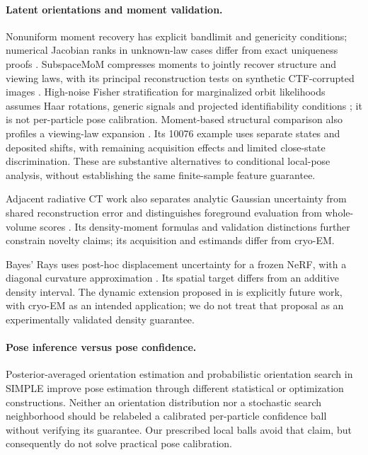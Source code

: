\paragraph{Latent orientations and moment validation.}
Nonuniform moment recovery has explicit bandlimit and genericity conditions;
numerical Jacobian ranks in unknown-law cases differ from exact uniqueness
proofs \citep{sharon2020}. SubspaceMoM compresses moments to jointly recover
structure and viewing laws, with its principal reconstruction tests on
synthetic CTF-corrupted images \citep{subspacemom2026}.
High-noise Fisher stratification for marginalized orbit likelihoods assumes
Haar rotations, generic signals and projected identifiability conditions
\citep{fan2024}; it is not per-particle pose calibration.
Moment-based structural comparison also profiles a viewing-law expansion
\citep{momentmetrics2024}. Its 10076 example uses separate states and deposited
shifts, with remaining acquisition effects and limited close-state discrimination.
These are substantive alternatives to conditional local-pose analysis, without
establishing the same finite-sample feature guarantee.

Adjacent radiative CT work also separates analytic Gaussian uncertainty from shared reconstruction error and distinguishes foreground evaluation from whole-volume scores \citep{zhao2026radiative}. Its density-moment formulas and validation distinctions further constrain novelty claims; its acquisition and estimands differ from cryo-EM.

Bayes' Rays uses post-hoc displacement uncertainty for a frozen NeRF, with a diagonal curvature approximation \citep{goli2024}. Its spatial target differs from an additive density interval. The dynamic extension proposed in \citet[Section 5.2]{patel2025thesis} is explicitly future work, with cryo-EM as an intended application; we do not treat that proposal as an experimentally validated density guarantee.

\paragraph{Pose inference versus pose confidence.} Posterior-averaged orientation estimation \citep{bayespose2026} and probabilistic orientation search in SIMPLE \citep{simple2025} improve pose estimation through different statistical or optimization constructions. Neither an orientation distribution nor a stochastic search neighborhood should be relabeled a calibrated per-particle confidence ball without verifying its guarantee. Our prescribed local balls avoid that claim, but consequently do not solve practical pose calibration.

